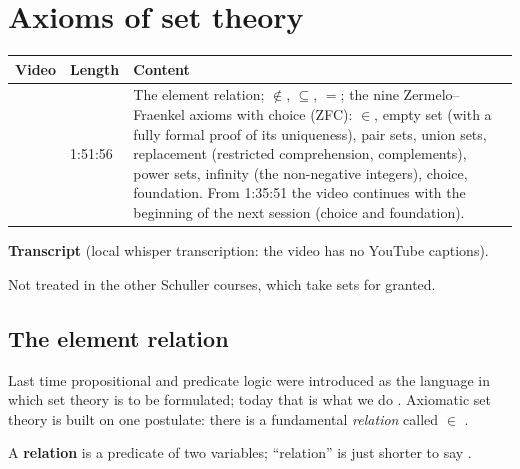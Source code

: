 \chapter{Axioms of set theory}\label{ch:l02}
\begin{paracol}{2}

\begin{sources}
\begin{tabularx}{\linewidth}{@{}l l L@{}}
\toprule
\textbf{Video} & \textbf{Length} & \textbf{Content}\\
\midrule
{} & 1:51:56 & The element relation; $\notin$, $\subseteq$, $=$;
the nine Zermelo--Fraenkel axioms with choice (ZFC): $\in$, empty set (with a fully formal proof of its
uniqueness), pair sets, union sets, replacement (restricted comprehension, complements), power sets,
infinity (the non-negative integers), choice, foundation. From 1:35:51 the video continues with the beginning of
the next session (choice and foundation).\\
\bottomrule
\end{tabularx}

\smallskip
\textbf{Transcript}  (local whisper transcription: the video has no
YouTube captions).
\end{sources}

\begin{reading}
Not treated in the other Schuller courses, which take sets for granted.
\end{reading}

\section{The element relation}\label{sec:se-in}

Last time propositional and predicate logic were introduced as the language in which set theory is to be
formulated; today that is what we do . Axiomatic set theory is built on one postulate: there is a
fundamental \emph{relation} called $\in$ .

\begin{definition}\label{def:se-relation}
A \textbf{relation} is a predicate of two variables; ``relation'' is just shorter to say .
\end{definition}


\end{paracol}
